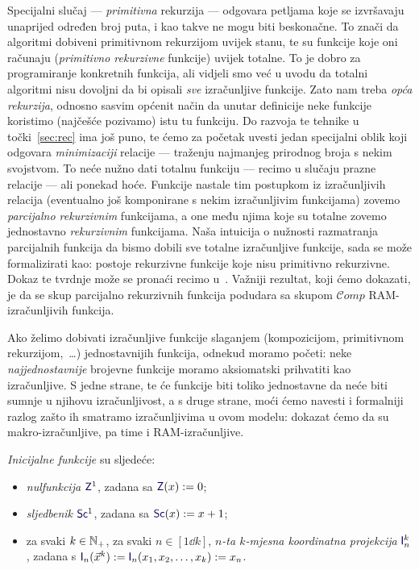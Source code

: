 Specijalni slučaj --- \emph{primitivna} rekurzija --- odgovara petljama koje se izvršavaju unaprijed određen broj puta, i kao takve ne mogu biti beskonačne. To znači da algoritmi dobiveni primitivnom rekurzijom uvijek stanu, te su funkcije koje oni računaju (\emph{primitivno rekurzivne} funkcije) uvijek totalne. To je dobro za programiranje konkretnih funkcija, ali vidjeli smo već u uvodu da totalni algoritmi nisu dovoljni da bi opisali \emph{sve} izračunljive funkcije. Zato nam treba \emph{opća rekurzija}, odnosno sasvim općenit način da unutar definicije neke funkcije koristimo (najčešće pozivamo) istu tu funkciju. Do razvoja te tehnike u točki~\ref{sec:rec} ima još puno, te ćemo za početak uvesti jedan specijalni oblik koji odgovara \emph{minimizaciji} relacije --- traženju najmanjeg prirodnog broja s nekim svojstvom. To neće nužno dati totalnu funkciju --- recimo u slučaju prazne relacije --- ali ponekad hoće. Funkcije nastale tim postupkom iz izračunljivih relacija (eventualno još komponirane s nekim izračunljivim funkcijama) zovemo \emph{parcijalno rekurzivnim} funkcijama, a one među njima koje su totalne zovemo jednostavno \emph{rekurzivnim} funkcijama. Naša intuicija o nužnosti razmatranja parcijalnih funkcija da bismo dobili sve totalne izračunljive funkcije, sada se može formalizirati kao: postoje rekurzivne funkcije koje nisu primitivno rekurzivne. Dokaz te tvrdnje može se pronaći recimo u~\cite[dodatak]{skr:Vuk}. Važniji rezultat, koji ćemo dokazati, je da se skup parcijalno rekurzivnih funkcija podudara sa skupom $\mathscr Comp$ RAM-izračunljivih funkcija. %


Ako želimo dobivati izračunljive funkcije slaganjem (kompozicijom, primitivnom rekurzijom,~\ldots) jednostavnijih funkcija, odnekud moramo početi: neke \emph{najjednostavnije} brojevne funkcije moramo aksiomatski prihvatiti kao izračunljive. S jedne strane, te će funkcije biti toliko jednostavne da neće biti sumnje u njihovu izračunljivost, a s druge strane, moći ćemo navesti i formalniji razlog zašto ih smatramo izračunljivima u ovom modelu: dokazat ćemo da su makro-izračunljive, pa time i RAM-izračunljive.

\begin{definicija}[{name=[inicijalne funkcije]}]\label{def:init}
\emph{Inicijalne funkcije} su sljedeće:
\begin{itemize}
    \item \emph{nulfunkcija} $\f Z^1$, zadana sa $\f Z(x):=0$;
    \item \emph{sljedbenik} $\f{Sc}^1$, zadana sa $\f{Sc}(x):=x+1$;
    \item za svaki $k\in{\mathbb N}_+$, za svaki $n\in[1\dd k]$, \emph{$n$-ta $k$-mjesna koordinatna projekcija} $\f I_n^k$, zadana s $\f I_n(\vec x^k):=\f I_n(x_1,x_2,\dotsc,x_k):=x_n$.\qedhere
\end{itemize}
\end{definicija}

